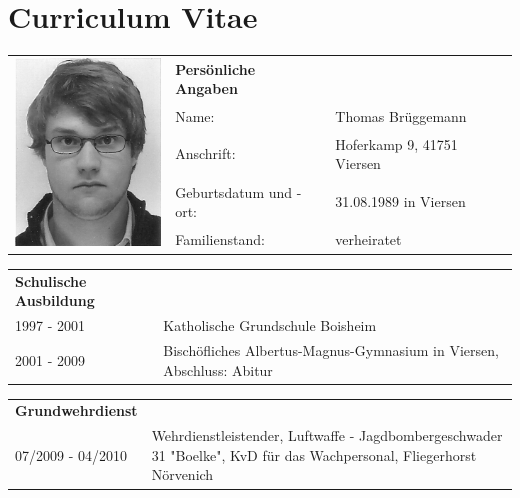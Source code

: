 \section*{Curriculum Vitae} 

\begin{flushleft}

\begin{tabular}{p{11em} p{10em} p{10em}}
    \multirow{5}{*}{\includegraphics[width=40mm]{figures/passfoto.jpg}} & \textbf{Persönliche Angaben} & \addspace \\
    & Name: & Thomas Brüggemann \\
    & Anschrift: & Hoferkamp 9, 41751 Viersen \\
    & Geburtsdatum und -ort: & 31.08.1989 in  Viersen \\
    & Familienstand: & verheiratet \\
\end{tabular}

\vspace{2.7em}

\begin{tabular}{p{11em} p{22.5em}}
    \textbf{Schulische Ausbildung} & \addspace \\
    1997 - 2001 & Katholische Grundschule Boisheim \\
    2001 - 2009 & Bischöfliches Albertus-Magnus-Gymnasium in Viersen, Abschluss: Abitur \\
\end{tabular}

\vspace{0.5em}

\begin{tabular}{p{11em} p{22.5em}}
    \textbf{Grundwehrdienst} & \addspace \\
    07/2009 - 04/2010 & \raggedright Wehrdienstleistender, Luftwaffe - Jagdbombergeschwader 31 "Boelke", KvD für das Wachpersonal, Fliegerhorst Nörvenich \\
\end{tabular}


\end{flushleft}
